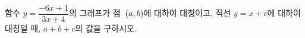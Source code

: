 함수 $y=\dfrac{-6x+1}{3x+4}$의 그래프가 점~$(a{,}\mkern3mu\mathopen{}b)$에 대하여 대칭이고, 직선 $y=x+c$에 대하여 대칭일 때, $a+b+c$의 값을 구하시오. 
